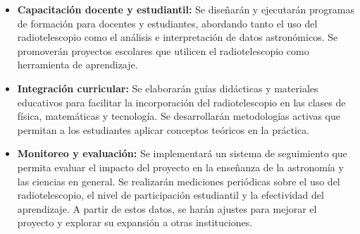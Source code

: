 \begin{itemize}
\item \textbf{Capacitación docente y estudiantil:} Se diseñarán y ejecutarán
programas de formación para docentes y estudiantes, abordando tanto el uso del
radiotelescopio como el análisis e interpretación de datos astronómicos. Se
promoverán proyectos escolares que utilicen el radiotelescopio como herramienta
de aprendizaje.

\item \textbf{Integración curricular:} Se elaborarán guías didácticas
y materiales educativos para facilitar la incorporación del radiotelescopio en
las clases de física, matemáticas y tecnología.
Se desarrollarán metodologías activas que permitan a los estudiantes aplicar
conceptos teóricos en la práctica.

\item \textbf{Monitoreo y evaluación:} Se implementará un sistema de seguimiento
que permita evaluar el impacto del proyecto en la enseñanza de la astronomía
y las ciencias en general.
Se realizarán mediciones periódicas sobre el uso del radiotelescopio, el nivel
de participación estudiantil y la efectividad del aprendizaje.
A partir de estos datos, se harán ajustes para mejorar el proyecto y explorar
su expansión a otras instituciones.

\end{itemize}
